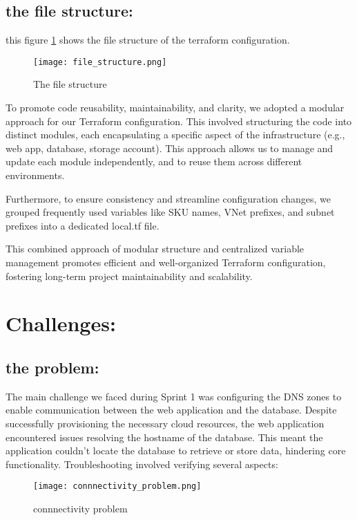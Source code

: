 \subsection*{the file structure:}
this figure \ref{fig:file_structure} shows the file structure of the terraform configuration.

\begin{figure}[htpb]
    \centering
    \texttt{[image: file\_structure.png]}
    \caption{The file structure}
    \label{fig:file_structure}
\end{figure}
To promote code reusability, maintainability, and clarity, we adopted a modular approach for our Terraform configuration. This involved structuring the code into distinct modules, each encapsulating a specific aspect of the infrastructure (e.g., web app, database, storage account). This approach allows us to manage and update each module independently, and to reuse them across different environments.
\par
Furthermore, to ensure consistency and streamline configuration changes, we grouped frequently used variables like SKU names, VNet prefixes, and subnet prefixes into a dedicated local.tf file.
\par
This combined approach of modular structure and centralized variable management promotes efficient and well-organized Terraform configuration, fostering long-term project maintainability and scalability.
\section{Challenges:}
\subsection*{the problem:}
The main challenge we faced during Sprint 1 was configuring the DNS zones to enable communication between the web application and the database. Despite successfully provisioning the necessary cloud resources, the web application encountered issues resolving the hostname of the database. This meant the application couldn't locate the database to retrieve or store data, hindering core functionality. Troubleshooting involved verifying several aspects:

\begin{figure}[htpb]
    \centering
    \texttt{[image: connnectivity\_problem.png]}
    \caption{connnectivity problem}
    \label{fig:connection_problem}
\end{figure}

